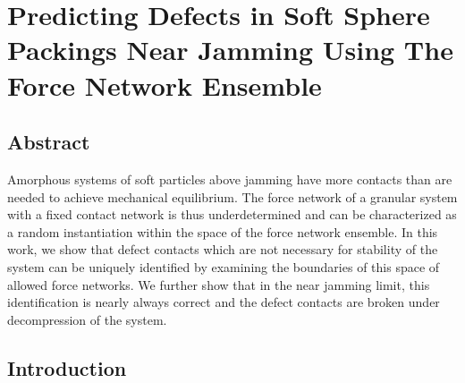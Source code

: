 \chapter{Predicting Defects in Soft Sphere Packings Near Jamming Using The Force Network Ensemble}
\author{James D. Sartor, Eric I. Corwin}

\label{contactBreaking}



\section{Abstract}

Amorphous systems of soft particles above jamming have more contacts than are needed to achieve mechanical equilibrium. The force network of a granular system with a fixed contact network is thus underdetermined and can be characterized as a random instantiation within the space of the force network ensemble. In this work, we show that defect contacts which are not necessary for stability of the system can be uniquely identified by examining the boundaries of this space of allowed force networks. We further show that in the near jamming limit, this identification is nearly always correct and the defect contacts are broken under decompression of the system.



\section{Introduction}

